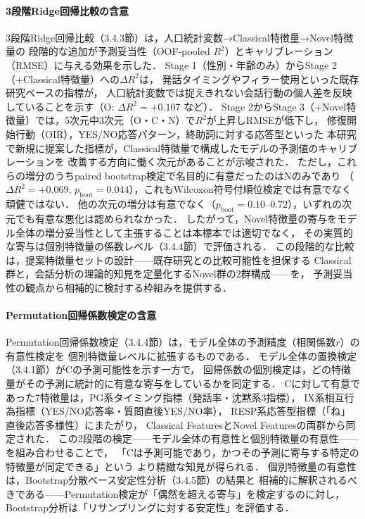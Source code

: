 \documentclass[dvipdfmx,11pt,a4paper]{bxjsarticle}
\renewcommand{\_}{\paperorigunderscore\allowbreak}%
\begin{document}
\paragraph{3段階Ridge回帰比較の含意}
3段階Ridge回帰比較（3.4.3節）は，人口統計変数→Classical特徴量→Novel特徴量の
段階的な追加が予測妥当性（OOF-pooled $R^2$）とキャリブレーション（RMSE）に与える効果を示した．
Stage 1（性別・年齢のみ）からStage 2（+Classical特徴量）への$\Delta R^2$は，
発話タイミングやフィラー使用といった既存研究ベースの指標が，
人口統計変数では捉えきれない会話行動の個人差を反映していることを示す（O: $\Delta R^2 = +0.107$ など）．
Stage 2からStage 3（+Novel特徴量）では，5次元中3次元（O・C・N）で$R^2$が上昇しRMSEが低下し，
修復開始行動（OIR），YES/NO応答パターン，終助詞に対する応答型といった
本研究で新規に提案した指標が，Classical特徴量で構成したモデルの予測値のキャリブレーションを
改善する方向に働く次元があることが示唆された．
ただし，これらの増分のうちpaired bootstrap検定で名目的に有意だったのはNのみであり
（$\Delta R^2 = +0.069$, $p_{\text{boot}} = 0.044$），これもWilcoxon符号付順位検定では有意でなく頑健ではない．
他の次元の増分は有意でなく（$p_{\text{boot}} = 0.10$--$0.72$），いずれの次元でも有意な悪化は認められなかった．
したがって，Novel特徴量の寄与をモデル全体の増分妥当性として主張することは本標本では適切でなく，
その実質的な寄与は個別特徴量の係数レベル（3.4.4節）で評価される．
この段階的な比較は，提案特徴量セットの設計——既存研究との比較可能性を担保する
Classical群と，会話分析の理論的知見を定量化するNovel群の2群構成——を，
予測妥当性の観点から相補的に検討する枠組みを提供する．

\paragraph{Permutation回帰係数検定の含意}
Permutation回帰係数検定（3.4.4節）は，モデル全体の予測精度（相関係数$r$）の有意性検定を
個別特徴量レベルに拡張するものである．
モデル全体の置換検定（3.4.1節）がCの予測可能性を示す一方で，
回帰係数の個別検定は，どの特徴量がその予測に統計的に有意な寄与をしているかを同定する．
Cに対して有意であった7特徴量は，PG系タイミング指標（発話率・沈黙系3指標），
IX系相互行為指標（YES/NO応答率・質問直後YES/NO率），
RESP系応答型指標（「ね」直後応答多様性）にまたがり，
Classical FeaturesとNovel Featuresの両群から同定された．
この2段階の検定——モデル全体の有意性と個別特徴量の有意性——を組み合わせることで，
「Cは予測可能であり，かつその予測に寄与する特定の特徴量が同定できる」という
より精緻な知見が得られる．
個別特徴量の有意性は，Bootstrap分散ベース安定性分析（3.4.5節）の結果と
相補的に解釈されるべきである——Permutation検定が「偶然を超える寄与」を検定するのに対し，
Bootstrap分析は「リサンプリングに対する安定性」を評価する．
\end{document}

